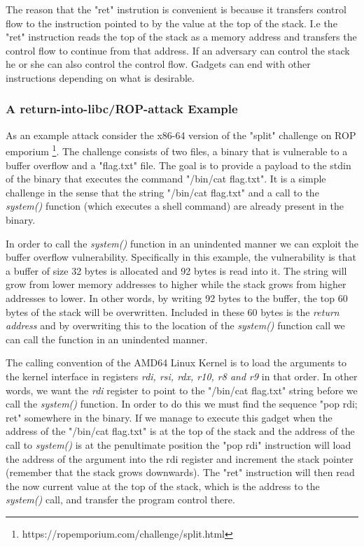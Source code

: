 The reason that the "ret" instrution is convenient is because it transfers control flow
to the instruction pointed to by the value at the top of the stack. I.e the "ret" instruction
reads the top of the stack as a memory address and transfers the control flow to continue
from that address. If an adversary can control the stack he or she can also control the
control flow. Gadgets can end with other instructions depending on what is desirable.

\subsubsection{A return-into-libc/ROP-attack Example}

As an example attack consider the x86-64 version of the "split" challenge on ROP emporium
\footnote{https://ropemporium.com/challenge/split.html}. The challenge consists of two
files, a binary that is vulnerable to a buffer overflow and a "flag.txt" file. The goal
is to provide a payload to the stdin of the binary that executes the command
"/bin/cat flag.txt". It is a simple challenge in the sense that the string "/bin/cat flag.txt"
and a call to the \textit{system()} function (which executes a shell command) are already
present in the binary.

In order to call the \textit{system()} function in an unindented manner we can exploit
the buffer overflow vulnerability. Specifically in this example, the vulnerability is that
a buffer of size 32 bytes is allocated and 92 bytes is read into it. The string will grow
from lower memory addresses to higher while the stack grows from higher addresses to
lower. In other words, by writing 92 bytes to the buffer, the top 60 bytes of the stack
will be overwritten. Included in these 60 bytes is the \textit{return address} and by
overwriting this to the location of the \textit{system()} function call we can call the
function in an unindented manner.

The calling convention of the AMD64 Linux Kernel is to load the arguments to the kernel
interface in registers \textit{rdi, rsi, rdx, r10, r8 and r9} in that order\cite{system-v-abi}.
In other words, we want the \textit{rdi} register to point to the "/bin/cat flag.txt" string
before we call the \textit{system()} function. In order to do this we must find the sequence
"pop rdi; ret" somewhere in the binary. If we manage to execute this gadget when the
address of the "/bin/cat flag.txt" is at the top of the stack and the address of the call to
\textit{system()} is at the penultimate position the "pop rdi" instruction will load the
address of the argument into the rdi register and increment the stack pointer (remember
that the stack grows downwards). The "ret" instruction will then read the now current
value at the top of the stack, which is the address to the \textit{system()} call, and
transfer the program control there.

